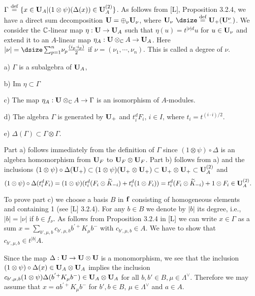 \noindent
$\Gamma\ {\buildrel{\text{def}}\over =}\ \{ x \in {\bold
U}_A|(1\otimes\psi)(\Delta(x))
\in {\bold U}_A^{(2)}\}$.  As follows from [L], Proposition 3.2.4, we have a
direct sum
decomposition  ${\bold U} = \oplus_\nu {\bold U}_\nu$, where ${\bold U}_\nu\
{\dsize\buildrel{\text{def}}\over =}\
{\bold U}_+({\bold U}_-^\nu)$.  We consider the ${\Bbb C}$-linear map  $\eta:
{\bold U} \to {\bold U}_A$  such
that  $\eta(u) = t^{|\nu|d} u$  for $u \in {\bold U}_\nu$  and extend it to an
$A$-linear map  $\eta_A:  {\bold U} \otimes_{\Bbb C} A \to {\bold U}_A$.  Here
$|\nu| = {\dsize\sum^n_{p=1}} \nu_p {\frac{(i_p\cdot i_p)}{2}}$  if
$\nu = (\nu_1,\cdots,\nu_n)$.  This is called a degree of $\nu$.

\proclaim{Proposition}  a)  $\Gamma$  is a subalgebra of  ${\bold U}_A$,

b)  Im $\eta \subset \Gamma$

c)  The map  $\eta_A: {\bold U} \otimes_{\Bbb C} A \to \Gamma$  is an
isomorphism of $A$-modules.

d)  The algebra  $\Gamma$  is generated by  ${\bold U}_+$  and
$t_i^d F_i$, $i \in I$, where  $t_i = t^{(i\cdot i)/2}$.

e)  $\Delta(\Gamma) \subset \Gamma \otimes \Gamma$.
\endproclaim

  Part a) follows immediately from the definition
of $\Gamma$  since  $(1 \otimes \psi) \circ \Delta$  is an algebra homomorphism
from ${\bold U}_F$  to  ${\bold U}_F \otimes {\bold U}_F$.  Part b) follows
from a)  and the
inclusions  $(1 \otimes \psi) \circ \Delta({\bold U}_+) \subset (1 \otimes
\psi)
({\bold U}_+ \otimes {\bold U}_+) \subset {\bold U}_+ \otimes {\bold U}_+
\subset {\bold U}_A^{(2)}$  and
$$
(1 \otimes \psi) \circ \Delta(t^d_iF_i) = (1 \otimes \psi)(t^d_i(F_i \otimes
\widetilde{K}_{-i}) + t^d_i(1 \otimes F_i)) = t^d_i(F_i \otimes
\widetilde{K}_{-i})
+ 1 \otimes F_i \in {\bold U}_A^{(2)}.
$$
\enddemo


  To prove part c) we choose a basis $B$ in ${\bold f}$
consisting of homogeneous elements and containing 1 (see [L] 3.2.4).  For any
$b \in B$  we denote by $|b|$  its degree, i.e., $|b| = |\nu|$ if
$b \in f_\nu$.  As follows from
Proposition 3.2.4 in [L] we can write  $x \in \Gamma$  as a sum
$x = \sum_{b',\mu,b} c_{b',\mu,b} b^{'+} K_\mu b^-$  with
$c_{b',\mu,b} \in A$.  We have to show that  $c_{b',\mu,b} \in t^{|b|}A$.

Since the map  $\Delta: {\bold U} \to {\bold U} \otimes {\bold U}$  is a
monomorphism, we see that the inclusion  $(1 \otimes \psi) \circ \Delta(x) \in
{\bold U}_A \otimes {\bold U}_A$ implies the inclusion
$c_{b',\mu,b}(1 \otimes \psi)\Delta (b^{'+}K_\mu b^-) \in {\bold U}_A
\otimes {\bold U}_A$  for all  $b,b' \in B, \mu \in \Lambda^\vee$.  Therefore
we may assume that  $x = ab^{'+} K_\mu b^-$  for  $b', b \in B$, $\mu \in
\Lambda^\vee$  and  $a \in A$.

